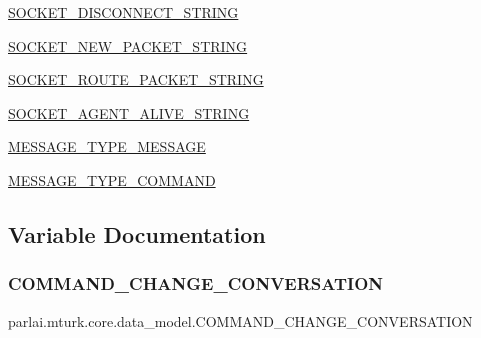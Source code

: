 \begin{DoxyCompactItemize}
\hyperlink{namespaceparlai_1_1mturk_1_1core_1_1data__model_a5fabd9fa49ff47ea751ed053dce85c27}{S\+O\+C\+K\+E\+T\+\_\+\+D\+I\+S\+C\+O\+N\+N\+E\+C\+T\+\_\+\+S\+T\+R\+I\+NG}
\item 
\hyperlink{namespaceparlai_1_1mturk_1_1core_1_1data__model_ad3966dbf2d2db4f2494d846f1316f6bd}{S\+O\+C\+K\+E\+T\+\_\+\+N\+E\+W\+\_\+\+P\+A\+C\+K\+E\+T\+\_\+\+S\+T\+R\+I\+NG}
\item 
\hyperlink{namespaceparlai_1_1mturk_1_1core_1_1data__model_a0c9250562d24e55b7cb5dec63ca49b3e}{S\+O\+C\+K\+E\+T\+\_\+\+R\+O\+U\+T\+E\+\_\+\+P\+A\+C\+K\+E\+T\+\_\+\+S\+T\+R\+I\+NG}
\item 
\hyperlink{namespaceparlai_1_1mturk_1_1core_1_1data__model_a67e68931174004c28f3a08b3d91ef8e3}{S\+O\+C\+K\+E\+T\+\_\+\+A\+G\+E\+N\+T\+\_\+\+A\+L\+I\+V\+E\+\_\+\+S\+T\+R\+I\+NG}
\item 
\hyperlink{namespaceparlai_1_1mturk_1_1core_1_1data__model_a596503398bf1ecddded14ff78d9a3a49}{M\+E\+S\+S\+A\+G\+E\+\_\+\+T\+Y\+P\+E\+\_\+\+M\+E\+S\+S\+A\+GE}
\item 
\hyperlink{namespaceparlai_1_1mturk_1_1core_1_1data__model_aeb79ffba49ff546f3c1e56cd3f801783}{M\+E\+S\+S\+A\+G\+E\+\_\+\+T\+Y\+P\+E\+\_\+\+C\+O\+M\+M\+A\+ND}
\end{DoxyCompactItemize}


\subsection{Variable Documentation}
\mbox{\label{namespaceparlai_1_1mturk_1_1core_1_1data__model_aa299eda497bd5fc8e6b867e19264bfbf}} 
\subsubsection{\texorpdfstring{C\+O\+M\+M\+A\+N\+D\+\_\+\+C\+H\+A\+N\+G\+E\+\_\+\+C\+O\+N\+V\+E\+R\+S\+A\+T\+I\+ON}{COMMAND\_CHANGE\_CONVERSATION}}
{\footnotesize\ttfamily parlai.\+mturk.\+core.\+data\+\_\+model.\+C\+O\+M\+M\+A\+N\+D\+\_\+\+C\+H\+A\+N\+G\+E\+\_\+\+C\+O\+N\+V\+E\+R\+S\+A\+T\+I\+ON}




